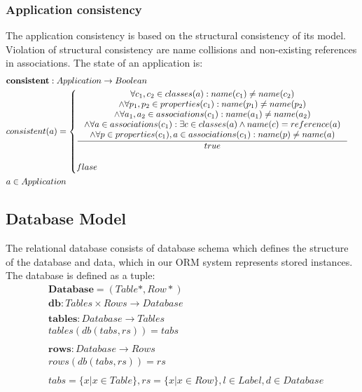 \documentclass[11pt]{article}
\begin{document}
\subsubsection{Application consistency}
The application consistency is based on the structural consistency of its model. Violation of structural consistency are name collisions and non-existing references in associations. The state of an application is:
\begin{align*}
&	\mathbf{consistent} : Application \rightarrow Boolean \\
&	consistent(a) = \begin{cases}
	\inference{\forall c_1, c_2 \in classes(a) : name(c_1) \neq name(c_2) \\ \wedge \forall p_1, p_2 \in properties(c_1) : name(p_1) \neq name(p_2) \\ \wedge \forall a_1, a_2 \in associations(c_1) : name(a_1) \neq name (a_2) \\ \wedge \forall a \in associations(c_1) : \exists c \in classes(a) \wedge name(c) = reference(a)\\
	\wedge \forall p \in properties(c_1), a \in associations(c_1) : name(p) \neq name(a) }{true}\\\\
 	flase
 	\end{cases}\\
&	a \in Application
\end{align*}


\subsection{Database Model}
\label{sec:dbModel}
The relational database consists of database schema which defines the structure of the database and data, which in our ORM system represents stored instances. The database is defined as a tuple:
\begin{align*}
&	\mathbf{Database} = ( Table*, Row* ) \\
&	\mathbf{db} : Tables \times Rows \rightarrow Database \\ \\
&	\mathbf{tables} : Database \rightarrow Tables \\
&	tables(db(tabs, rs)) = tabs \\ \\
&	\mathbf{rows} : Database \rightarrow Rows \\
&	rows(db(tabs, rs)) = rs \\ \\
&	tabs  = \{ x | x \in Table\}, rs  = \{ x | x \in Row\}, l \in Label,d \in Database
\end{align*}
\end{document}
